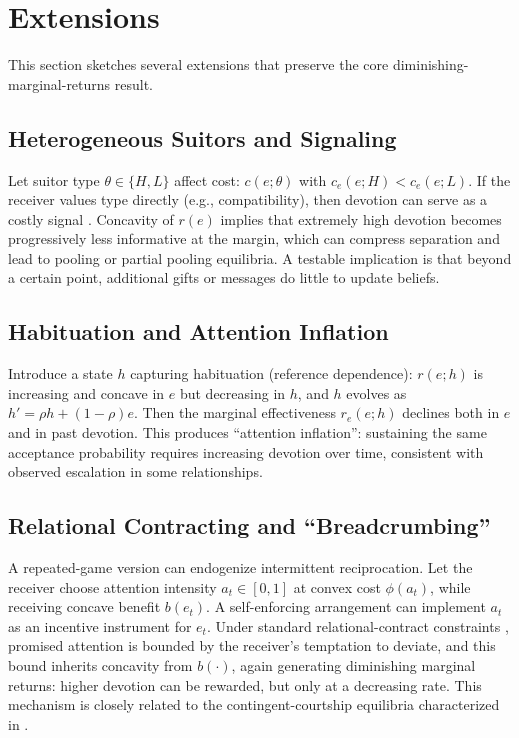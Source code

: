 \documentclass[AER]{AEA}
\begin{document}
\section{Extensions}

This section sketches several extensions that preserve the core diminishing-marginal-returns result.

\subsection{Heterogeneous Suitors and Signaling}

Let suitor type $\theta \in \{H, L\}$ affect cost: $c(e; \theta)$ with $c_e(e; H) <
c_e(e; L)$. If the receiver values type directly (e.g., compatibility), then devotion can
serve as a costly signal \citep{Spence1973}. Concavity of $r(e)$ implies that extremely
high devotion becomes progressively less informative at the margin, which can compress
separation and lead to pooling or partial pooling equilibria. A testable implication is
that beyond a certain point, additional gifts or messages do little to update beliefs.

\subsection{Habituation and Attention Inflation}

Introduce a state $h$ capturing habituation (reference dependence): $r(e; h)$ is
increasing and concave in $e$ but decreasing in $h$, and $h$ evolves as $h' = \rho h +
(1 - \rho)e$. Then the marginal effectiveness $r_e(e; h)$ declines both in $e$ and in
past devotion. This produces ``attention inflation'': sustaining the same acceptance
probability requires increasing devotion over time, consistent with observed escalation
in some relationships.

\subsection{Relational Contracting and ``Breadcrumbing''}

A repeated-game version can endogenize intermittent reciprocation. Let the receiver choose
attention intensity $a_t \in [0, 1]$ at convex cost $\phi(a_t)$, while receiving concave
benefit $b(e_t)$. A self-enforcing arrangement can implement $a_t$ as an incentive
instrument for $e_t$. Under standard relational-contract constraints
\citep{BakerGibbonsMurphy2002, Levin2003}, promised attention is bounded by the
receiver's temptation to deviate, and this bound inherits concavity from $b(\cdot)$,
again generating diminishing marginal returns: higher devotion can be rewarded, but only
at a decreasing rate. This mechanism is closely related to the contingent-courtship
equilibria characterized in \citet{Price2026}.
\end{document}

